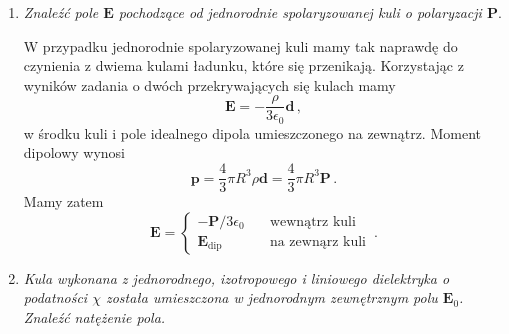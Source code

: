 \documentclass[../main.tex]{subfiles}
\begin{document}
\begin{enumerate}
    \item \textit{Znaleźć pole \(\mathbf{E}\) pochodzące od jednorodnie spolaryzowanej kuli o
    polaryzacji \(\mathbf{P}\)}.
\medskip

\noindent W przypadku jednorodnie spolaryzowanej kuli mamy tak naprawdę do czynienia z dwiema kulami
ładunku, które się przenikają. Korzystając z wyników zadania o dwóch przekrywających się kulach mamy
\begin{equation*}
    \mathbf{E}=-\frac{\rho}{3\epsilon_0}\mathbf{d}\,,
\end{equation*}
w środku kuli i pole idealnego dipola umieszczonego na zewnątrz. Moment dipolowy wynosi
\begin{equation*}
    \mathbf{p}=\frac{4}{3}\pi R^3\rho\mathbf{d}=\frac{4}{3}\pi R^3\mathbf{P}\,.
\end{equation*}
Mamy zatem
\begin{equation*}
    \mathbf{E}=\begin{cases} -\mathbf{P}/3\epsilon_0&\quad\text{wewnątrz kuli}\\ \mathbf{E}_\text{dip}&\quad\text{na zewnąrz kuli}\end{cases}\,.
\end{equation*}

\item \textit{Kula wykonana z jednorodnego, izotropowego i liniowego dielektryka o podatności
\(\chi\) została umieszczona w jednorodnym zewnętrznym polu \(\mathbf{E}_0\). Znaleźć natężenie
pola.}
\medskip


\end{enumerate}
\end{document}
